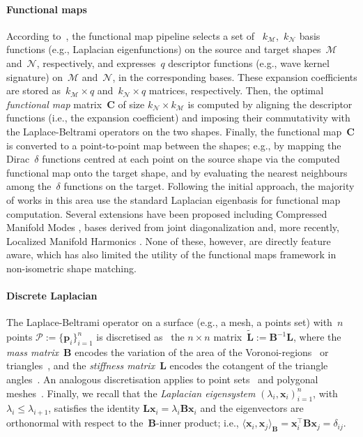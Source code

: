 \documentclass[acmtog,authorversion]{acmart}
\newcommand{\M}{\mathcal{M}}
\newcommand{\N}{\mathcal{N}}
\begin{document}
\paragraph*{Functional maps}
According to~\citep{OVSJANIKOV2012,OVSJANIKOV2017-STAR}, the functional map pipeline selects a set of ~$k_\M$,~$k_\N$ basis functions (e.g., Laplacian eigenfunctions) on the source and target shapes~$\M$ and~$\N$, respectively, and expresses~$q$ descriptor functions (e.g., wave kernel signature) on~$\mathcal{M}$ and~$\mathcal{N}$, in the corresponding bases. These expansion coefficients are stored as~$k_\M \times q$ and~$k_\N \times q$ matrices, respectively. Then, the optimal \emph{functional map} matrix~$\mathbf{C}$ of size \mbox{$k_\N \times k_\M$} is computed by aligning the descriptor functions (i.e., the expansion coefficient) and imposing their commutativity with the Laplace-Beltrami operators on the two shapes. Finally, the functional map~$\mathbf{C}$ is converted to a point-to-point map between the shapes; e.g., by mapping the Dirac~$\delta$ functions centred at each point on the source shape via the computed functional map onto the target shape, and by evaluating the nearest neighbours among the~$\delta$ functions on the target. Following the initial approach,  the  majority of works in this area use the standard Laplacian eigenbasis for functional map computation. Several extensions have been proposed including Compressed Manifold Modes
, bases derived from joint diagonalization 
and, more recently, Localized Manifold Harmonics %
. None of these, however, are directly feature aware, which has also limited the utility of the functional maps framework in non-isometric shape matching.

\paragraph*{Discrete Laplacian}
The Laplace-Beltrami operator on a surface (e.g., a mesh, a points set) with~$n$ points \mbox{$\mathcal{P}:=\{\mathbf{p}_{i}\}_{i=1}^{n}$} is discretised as~ the \mbox{$n\times n$} matrix~$\mbox{$\tilde{\mathbf{L}}:=\mathbf{B}^{-1}\mathbf{L}$}$, where the \emph{mass matrix}~$\mathbf{B}$ encodes the variation of the area of the Voronoi-regions~\citep{DESBRUN1999} or triangles~\citep{reuter:cad06}, and the \emph{stiffness matrix}~$\mathbf{L}$ encodes the cotangent of the triangle angles~\citep{PINKALL1993}. An analogous discretisation applies to point sets~\citep{BELKIN2003,LIU2012} and polygonal meshes~\citep{ALEXA2011,HERHOLZ2015}. Finally, we recall that the \emph{Laplacian eigensystem} \mbox{$(\lambda_{i},\mathbf{x}_{i})_{i=1}^{n}$}, with \mbox{$\lambda_{i}\leq\lambda_{i+1}$}, satisfies the identity \mbox{$\mathbf{L}\mathbf{x}_{i}=\lambda_{i}\mathbf{B}\mathbf{x}_{i}$} and the eigenvectors are orthonormal with respect to the~$\mathbf{B}$-inner product; i.e., \mbox{$\langle\mathbf{x}_{i},\mathbf{x}_{j}\rangle_{\mathbf{B}}=\mathbf{x}_{i}^{\top}\mathbf{B}\mathbf{x}_{j}=\delta_{ij}$}.
\end{document}
